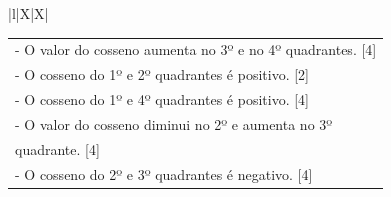 \begin{xltabular}{\textwidth}{|l|X|X|}
{\begin{tabular}[c]{@{}l@{}}
			
			\\- O valor do cosseno aumenta no 3º e no 4º quadrantes. [4] 
			\\- O cosseno do 1º e 2º quadrantes é positivo. [2]
			\\- O cosseno do 1º e 4º quadrantes é positivo. [4]
			\\- O valor do cosseno diminui no 2º e aumenta no 3º \\quadrante. [4]
			\\- O cosseno do 2º e 3º quadrantes é negativo. [4]
			
	\end{tabular} }\\ \hline
	 \\ \hline
	 \\ \hline
	 \\ \hline
	 \\ \hline
	\\ \hline
	

\end{xltabular}
